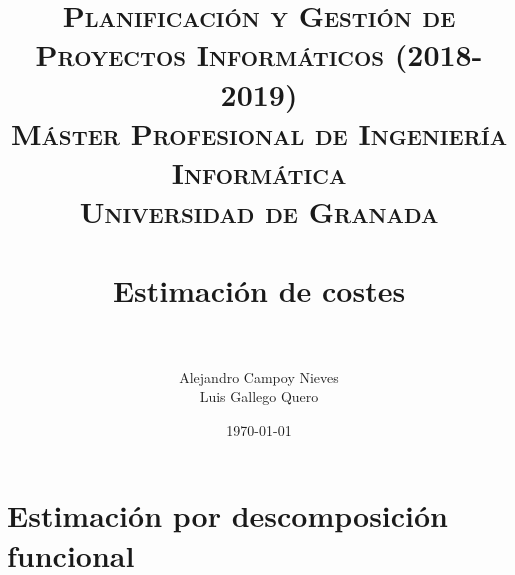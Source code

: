 


\title{	
	\normalfont \normalsize 
	\textsc{\textbf{Planificación y Gestión de Proyectos Informáticos (2018-2019)} \\ Máster Profesional de Ingeniería Informática \\ Universidad de Granada} \\ [25pt] %
	\horrule{0.5pt} \\[0.4cm] %
	\huge Estimación de costes \\ %
	\horrule{2pt} \\[0.5cm] %
}

\author{Alejandro Campoy Nieves \\ Luis Gallego Quero} %
\date{\normalsize\today} %
\usepackage{graphicx}
\usepackage{hyperref} %
\usepackage{eurosym} %




\maketitle %

\newpage %

\tableofcontents %


\listoftables	

\newpage		
 
\section{Estimación por descomposición funcional}

